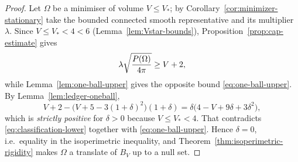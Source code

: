 \begin{proof}
Let $\Omega$ be a minimiser of volume $V\le V_*$; by
Corollary~\ref{cor:minimizer-stationary} take the bounded connected smooth
representative and its multiplier $\lambda$.  Since $V\le V_*<4<6$
(Lemma~\ref{lem:Vstar-bounds}), Proposition~\ref{prop:cap-estimate} gives
\begin{equation}\label{eq:classification-lower}
  \lambda\sqrt{\frac{P(\Omega)}{4\pi}}\ge V+2 ,
\end{equation}
while Lemma~\ref{lem:one-ball-upper} gives the opposite bound
\eqref{eq:one-ball-upper}.  By Lemma~\ref{lem:ledger-oneball},
\[
  V+2-\bigl(V+5-3(1+\delta)^2\bigr)(1+\delta)
  =\delta\bigl(4-V+9\delta+3\delta^2\bigr),
\]
which is \emph{strictly positive} for $\delta>0$ because $V\le V_*<4$.  That
contradicts \eqref{eq:classification-lower} together with
\eqref{eq:one-ball-upper}.  Hence $\delta=0$, i.e.\ equality in the
isoperimetric inequality, and Theorem~\ref{thm:isoperimetric-rigidity} makes
$\Omega$ a translate of $B_V$ up to a null set.
\end{proof}

